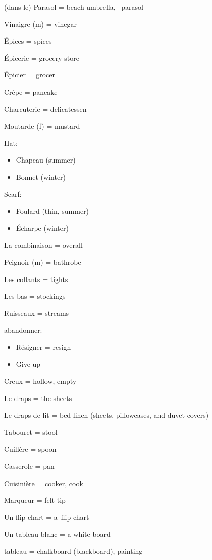 ({dans} le) Parasol = beach umbrella,~ parasol~

Vinaigre (m) = vinegar~

Épices = spices~

Épicerie = grocery store~

Épicier = grocer

Crêpe = pancake~

Charcuterie = delicatessen~

Moutarde (f) = mustard~

Hat:

\begin{itemize}
\item
  Chapeau (summer)
\item
  Bonnet (winter)
\end{itemize}

Scarf:

\begin{itemize}
\item
  Foulard (thin, summer)
\item
  Écharpe (winter)
\end{itemize}

La combinaison = overall~

Peignoir (m) = bathrobe~

Les collants = tights

Les bas = stockings~

Ruisseaux = streams~

abandonner:

\begin{itemize}
\item
  Résigner = resign~
\item
  Give up
\end{itemize}

Creux = hollow, empty~

Le draps = the sheets~

Le draps de lit = bed linen (sheets, pillowcases, and duvet covers)

Tabouret = stool

Cuillère = spoon~

Casserole = pan

Cuisinière = cooker, cook

Marqueur = felt tip

Un flip-chart = a~flip chart

Un tableau blanc = a white board~

tableau = chalkboard (blackboard), painting

